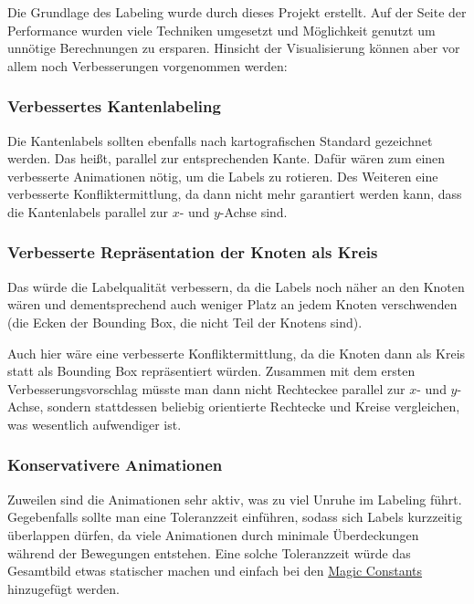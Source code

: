 %
%

Die Grundlage des Labeling wurde durch dieses Projekt erstellt. Auf der Seite der Performance wurden viele Techniken umgesetzt
und Möglichkeit genutzt um unnötige Berechnungen zu ersparen. Hinsicht der Visualisierung können aber vor allem noch Verbesserungen vorgenommen werden:

\subsubsection{Verbessertes Kantenlabeling}
Die Kantenlabels sollten ebenfalls nach kartografischen Standard gezeichnet werden. Das heißt, parallel zur entsprechenden Kante.
Dafür wären zum einen verbesserte Animationen nötig, um die Labels zu rotieren. Des Weiteren eine verbesserte Konfliktermittlung,
da dann nicht mehr garantiert werden kann, dass die Kantenlabels parallel zur $x$- und $y$-Achse sind.

\subsubsection{Verbesserte Repräsentation der Knoten als Kreis}
Das würde die Labelqualität verbessern, da die Labels noch näher an den Knoten wären und dementsprechend auch weniger Platz an jedem Knoten verschwenden (die Ecken der Bounding Box, die nicht Teil der Knotens sind).

Auch hier wäre eine verbesserte Konfliktermittlung, da die Knoten dann als Kreis statt als Bounding Box repräsentiert würden.
Zusammen mit dem ersten Verbesserungsvorschlag müsste man dann nicht Rechteckee parallel zur $x$- und $y$-Achse, sondern stattdessen beliebig orientierte Rechtecke und Kreise vergleichen, was wesentlich aufwendiger ist.

\subsubsection{Konservativere Animationen}
Zuweilen sind die Animationen sehr aktiv, was zu viel Unruhe im Labeling führt. Gegebenfalls sollte man eine Toleranzzeit einführen,
sodass sich Labels kurzzeitig überlappen dürfen, da viele Animationen durch minimale Überdeckungen während der Bewegungen entstehen.
Eine solche Toleranzzeit würde das Gesamtbild etwas statischer machen und einfach bei den \hyperref[subsec:consts]{Magic Constants} hinzugefügt werden.